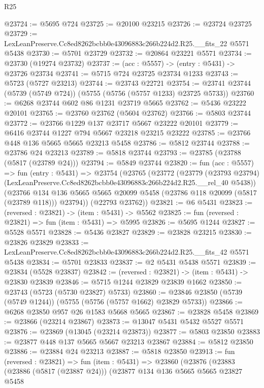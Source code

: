 \begin{lexlean}{R25}
\begin{coremodule}
@23724 := @5695 @724
@23725 := @20100 @23215
@23726 := @23724 @23725
@23729 := LexLeanPreserve.Cc8ed8262bcbb0e43096883c266b224d2.R25.__fits_22 @5571 @5438
@23730 := @5701 @23729
@23732 := @20864 @23221 @5571
@23734 := @23730 (@19274 @23732)
@23737 := (acc : @5557) -> (entry : @5431) -> @23726 @23734
@23741 := @5715 @724 @23725 @23734 @1233
@23743 := @5723 (@5727 @23213)
@23744 := @23743 @22721
@23754 := @23741 @23744 (@5739 (@5749 @724)) (@5755 (@5756 (@5757 @1233) @23725 @5733))
@23760 := @6268 @23744 @602 @86 @1231 @23719 @5665
@23762 := @5436 @23222 @20101
@23765 := @23760 @23762 (@5604 @23762)
@23766 := @5803 @23744
@23772 := @23766 @1229 @137 @23717 @5667 @23222 @20101
@23779 := @6416 @23744 @1227 @794 @5667 @23218 @23215 @23222
@23785 := @23766 @448 @136 @5665 @5665 @23213 @5458
@23786 := @5812 @23744
@23788 := @23786 @24 @23213
@23789 := @5818 @23744
@23793 := @23785 (@23788 (@5817 (@23789 @24)))
@23794 := @5849 @23744
@23820 := fun (acc : @5557) =>
  fun (entry : @5431) =>
  @23754
    (@23765
      (@23772
        (@23779
          (@23793 @23794)
          (LexLeanPreserve.Cc8ed8262bcbb0e43096883c266b224d2.R25.__rel_40 @5438))
        (@23766
          @134
          @136
          @5665
          @5665
          @20099
          @5458
          (@23786 @118 @20099 (@5817 (@23789 @118)))
          @23794))
      (@22793 @23762))
@23821 := @6 @5431
@23823 := (reversed : @23821) -> (item : @5431) -> @5562
@23825 := fun (reversed : @23821) => fun (item : @5431) => @5995
@23826 := @5695 @1244
@23827 := @5528 @5571
@23828 := @5436 @23827
@23829 := @23828 @23215
@23830 := @23826 @23829
@23833 := LexLeanPreserve.Cc8ed8262bcbb0e43096883c266b224d2.R25.__fits_42 @5571 @5438
@23834 := @5701 @23833
@23837 := @2 @5431 @5438 @5571
@23839 := @23834 (@5528 @23837)
@23842 := (reversed : @23821) -> (item : @5431) -> @23830 @23839
@23846 := @5715 @1244 @23829 @23839 @1662
@23850 := @23743 (@5723 (@5730 @23827) @5733)
@23860 := @23846 @23850 (@5739 (@5749 @1244)) (@5755 (@5756 (@5757 @1662) @23829 @5733))
@23866 := @6268 @23850 @957 @26 @1583 @5668 @5665
@23867 := @23828 @5458
@23869 := @23866 (@23214 @23867)
@23873 := @13047 @5431 @5432 @5527 @5571
@23876 := @23869 (@13045 (@23214 @23873))
@23877 := @5803 @23850
@23883 := @23877 @448 @137 @5665 @5667 @23213 @23867
@23884 := @5812 @23850
@23886 := @23884 @24 @23213
@23887 := @5818 @23850
@23913 := fun (reversed : @23821) =>
  fun (item : @5431) =>
  @23860
    (@23876
      (@23883
        (@23886 (@5817 (@23887 @24)))
        (@23877
          @134
          @136
          @5665
          @5665
          @23827
          @5458

\end{coremodule}
\end{lexlean}
